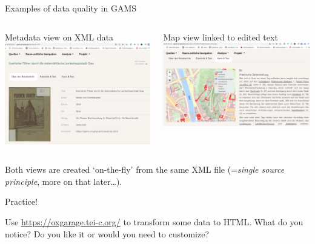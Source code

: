 \begin{frame}[allowframebreaks]{Examples of data quality in GAMS}
\begin{columns}
   \begin{block}{Metadata view on XML data}
    \includegraphics[width=\textwidth]{img/gams-beurb1.png}
   \end{block}
    \begin{block}{Map view linked to edited text} 
    \includegraphics[width=\textwidth]{img/gams-beurb2.png}
    \end{block}
    \end{columns}
    Both views are created `on-the-fly' from the same XML file (=\emph{single source principle}, more on that later\dots).
\end{frame}





\begin{frame}[standout]

  \alert{Practice!}
  
  \normalsize
  Use \alert{\protect\url{https://oxgarage.tei-c.org/}} to transform some data to HTML. What do you notice? Do you like it or would you need to customize?
\end{frame}



